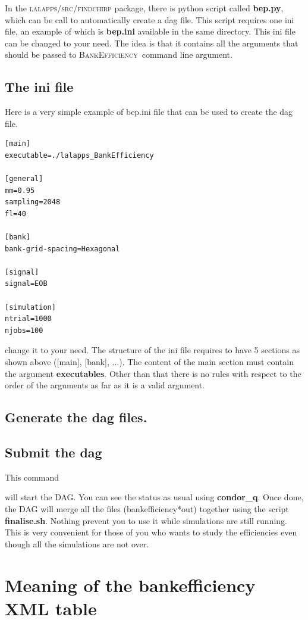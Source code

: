 \documentclass[a4paper,10pt]{article}
\newcommand{\code}[1]{%
\begin{center}
  \fboxsep=10pt
  \fcolorbox{black}{yellow}
  { \parbox[c]{12cm}{ \color{blue}{#1}}}
\end{center}}
\newcommand{\be}{\textsc{BankEfficiency}~}
\begin{document}
In the \textsc{lalapps/src/findchirp} package, there is python script called \textbf{bep.py}, which can be call to automatically create a dag file. This script requires one ini file, an example of which is \textbf{bep.ini} available in the same directory. This ini file can be changed to your need. The idea is that it contains all the arguments that should be passed to \be command line argument. 


\subsection{The ini file}\label{ini}
Here is a very simple example of bep.ini file that can be used to create the dag file. 

\begin{verbatim}
[main]
executable=./lalapps_BankEfficiency

[general]
mm=0.95
sampling=2048
fl=40

[bank]
bank-grid-spacing=Hexagonal

[signal]
signal=EOB

[simulation]
ntrial=1000
njobs=100
\end{verbatim}

change it to your need. The structure of the ini file  requires to have 5 sections as shown above ([main], [bank], ...). The content of the main section must contain the argument \textbf{executables}. Other than that there is no rules with respect to the order of the arguments as far as it is a valid  argument. 

\subsection{Generate the dag files.}\label{dag}
\code{python bep.py --config-file bep.ini}

\subsection{Submit the dag}
This command 
\code{condor\_submit\_dag -maxjobs 100  -f bep.dag}
will start the \textsc{DAG}. You can see the status as usual using \textbf{condor\_q}. Once done, the \textsc{DAG} will merge all the files (bankefficiency*out) together using the script \textbf{finalise.sh}. Nothing prevent you to use it while simulations are still running. This is very convenient for those of you who wants to study the efficiencies even though all the simulations are not over. 


\section{Meaning of the bankefficiency XML table}\label{xml}
\end{document}
